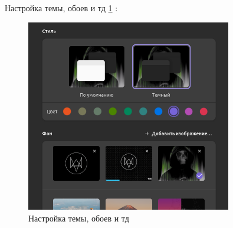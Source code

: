 \newpage

Настройка темы, обоев и тд \ref{fig:settingUbuntu2} :

\begin{figure}[!h]
    \centering
    \includegraphics[width = 0.8\textwidth]{images/settingUbuntu2.png}
    
    \caption{Настройка темы, обоев и тд}
    
    \label{fig:settingUbuntu2}
\end{figure}

